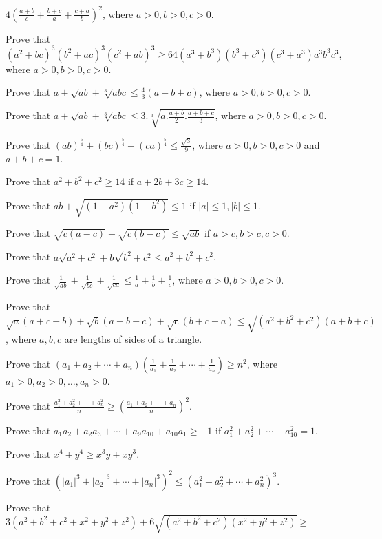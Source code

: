   $4\left(\frac{a + b}{c} + \frac{b + c}{a} + \frac{c + a}{b}\right)^2$, where $a > 0, b > 0, c > 0$.
\item Prove that $(a^2 + bc)^3(b^2 + ac)^3(c^2 + ab)^3\geq 64(a^3 + b^3)(b^3 + c^3)(c^3 + a^3)a^3b^3c^3$, where $a > 0, b > 0, c > 0$.
\item Prove that $a + \sqrt{ab} + \sqrt[3]{abc}\leq \frac{4}{3}(a + b + c)$, where $a > 0, b > 0, c > 0$.
\item Prove that $a + \sqrt{ab} + \sqrt[3]{abc}\leq 3.\sqrt[3]{a . \frac{a + b}{2} . \frac{a + b + c}{3}}$, where $a > 0, b > 0, c
  > 0$.
\item Prove that $(ab)^{\tfrac{5}{4}} + (bc)^{\tfrac{5}{4}} + (ca)^{\tfrac{5}{4}} \leq \frac{\sqrt{3}}{9}$, where $a > 0, b > 0, c >
  0$ and $a + b + c = 1$.
\item Prove that $a^2 + b^2 + c^2 \geq 14$ if $a + 2b + 3c\geq 14$.
\item Prove that $ab + \sqrt{(1 - a^2)(1 - b^2)}\leq 1$ if $|a|\leq 1, |b|\leq 1$.
\item Prove that $\sqrt{c(a - c)} + \sqrt{c(b - c)}\leq \sqrt{ab}$ if $a > c, b > c, c > 0$.
\item Prove that $a\sqrt{a^2 + c^2} + b\sqrt{b^2 + c^2}\leq a^2 + b^2 + c^2$.
\item Prove that $\frac{1}{\sqrt{ab}} + \frac{1}{\sqrt{bc}} + \frac{1}{\sqrt{ca}}\leq \frac{1}{a} + \frac{1}{b} + \frac{1}{c}$,
  where $a > 0, b > 0, c > 0$.
\item Prove that $\sqrt{a}(a + c - b) + \sqrt{b}(a + b - c) + \sqrt{c}(b + c - a)\leq \sqrt{(a^2 + b^2 + c^2)(a + b + c)}$, where
  $a, b, c$ are lengths of sides of a triangle.
\item Prove that $(a_1 + a_2 + \cdots + a_n)\left(\frac{1}{a_1} + \frac{1}{a_2} + \cdots + \frac{1}{a_n}\right)\geq n^2$, where
  $a_1 > 0, a_2 > 0, \ldots, a_n > 0$.
\item Prove that $\frac{a_1^2 + a_2^2 + \cdots + a_n^2}{n}\geq \left(\frac{a_1 + a_2 + \cdots + a_n}{n}\right)^2$.
\item Prove that $a_1a_2 + a_2a_3 + \cdots + a_9a_{10} + a_{10}a_1\geq -1$ if $a_1^2 + a_2^2 + \cdots + a_{10}^2 = 1$.
\item Prove that $x^4 + y^4 \geq x^3y + xy^3$.
\item Prove that $\left(|a_1|^3 + |a_2|^3 + \cdots + |a_n|^3\right)^2\leq \left(a_1^2 + a_2^2 + \cdots + a_n^2\right)^3$.
\item Prove that $3\left(a^2 + b^2 + c^2 + x^2 + y^2 + z^2\right) + 6\sqrt{\left(a^2 + b^2 + c^2\right)\left(x^2 + y^2 +
  z^2\right)}\geq$

